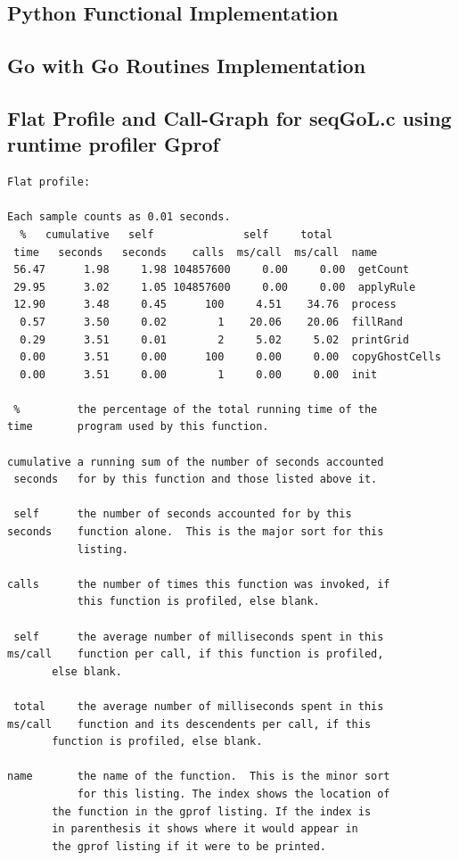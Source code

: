 \documentclass[11pt]{article} %
\begin{document}
\subsection{Python Functional Implementation}

\pagebreak
\subsection{Go with Go Routines Implementation}

\pagebreak
\subsection{Flat Profile and Call-Graph for seqGoL.c using runtime profiler Gprof}
\begingroup
\fontsize{10pt}{8pt}
\begin{verbatim}
Flat profile:

Each sample counts as 0.01 seconds.
  %   cumulative   self              self     total           
 time   seconds   seconds    calls  ms/call  ms/call  name    
 56.47      1.98     1.98 104857600     0.00     0.00  getCount
 29.95      3.02     1.05 104857600     0.00     0.00  applyRule
 12.90      3.48     0.45      100     4.51    34.76  process
  0.57      3.50     0.02        1    20.06    20.06  fillRand
  0.29      3.51     0.01        2     5.02     5.02  printGrid
  0.00      3.51     0.00      100     0.00     0.00  copyGhostCells
  0.00      3.51     0.00        1     0.00     0.00  init

 %         the percentage of the total running time of the
time       program used by this function.

cumulative a running sum of the number of seconds accounted
 seconds   for by this function and those listed above it.

 self      the number of seconds accounted for by this
seconds    function alone.  This is the major sort for this
           listing.

calls      the number of times this function was invoked, if
           this function is profiled, else blank.
 
 self      the average number of milliseconds spent in this
ms/call    function per call, if this function is profiled,
	   else blank.

 total     the average number of milliseconds spent in this
ms/call    function and its descendents per call, if this 
	   function is profiled, else blank.

name       the name of the function.  This is the minor sort
           for this listing. The index shows the location of
	   the function in the gprof listing. If the index is
	   in parenthesis it shows where it would appear in
	   the gprof listing if it were to be printed.



\end{verbatim}
\end{document}
